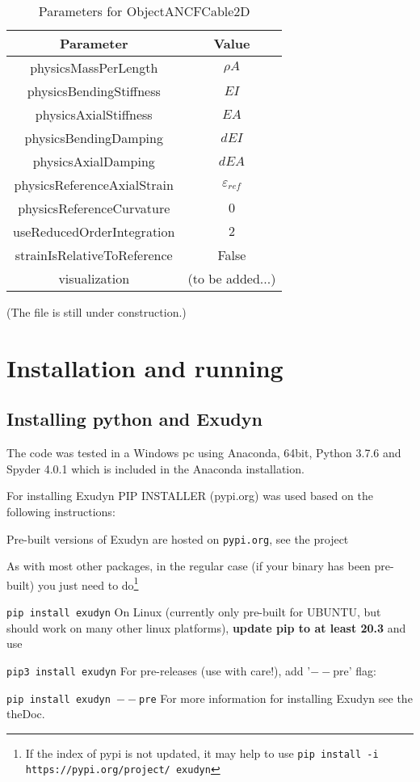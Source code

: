 \begin{table}
    \caption{Parameters for ObjectANCFCable2D} \label{tab:ObjectANCFCable2D}
    \centering
    \begin{tabular}{c|c} \hline
        Parameter & Value \\ \hline 
        physicsMassPerLength & $\rho A$\\
        physicsBendingStiffness & $EI$\\
        physicsAxialStiffness & $EA$\\
        physicsBendingDamping & $dEI$\\
        physicsAxialDamping & $dEA$\\
        physicsReferenceAxialStrain  & $\varepsilon_{ref}$\\
        physicsReferenceCurvature & $0$\\
        useReducedOrderIntegration & $2$\\
        strainIsRelativeToReference & False\\
        visualization & (to be added...)\\ \hline
    \end{tabular}
\end{table}
\ei
(The file is still under construction.)
\section{Installation and running}
\subsection{Installing python and Exudyn}
The code was tested in a Windows pc using Anaconda, 64bit, Python 3.7.6 and Spyder 4.0.1 which is included in the Anaconda installation.

For installing Exudyn PIP INSTALLER (pypi.org) was used based on the following instructions:

Pre-built versions of Exudyn are hosted on \texttt{pypi.org}, see the project
\bi
 \item {}
\ei
As with most other packages, in the regular case (if your binary has been pre-built) you just need to do\footnote{If the index of pypi is not updated, it may help to use \texttt{pip install -i https://pypi.org/project/ exudyn} }
\bi
  \item[] \texttt{pip install exudyn}
\ei
On Linux (currently only pre-built for UBUNTU, but should work on many other linux platforms), {\bf update pip to at least 20.3} and use 
\bi
  \item[] \texttt{pip3 install exudyn}
\ei
For pre-releases (use with care!), add '$--$pre' flag:
\bi
  \item[] \texttt{pip install exudyn $--$pre}
\ei                 
For more information for installing Exudyn see the theDoc.
